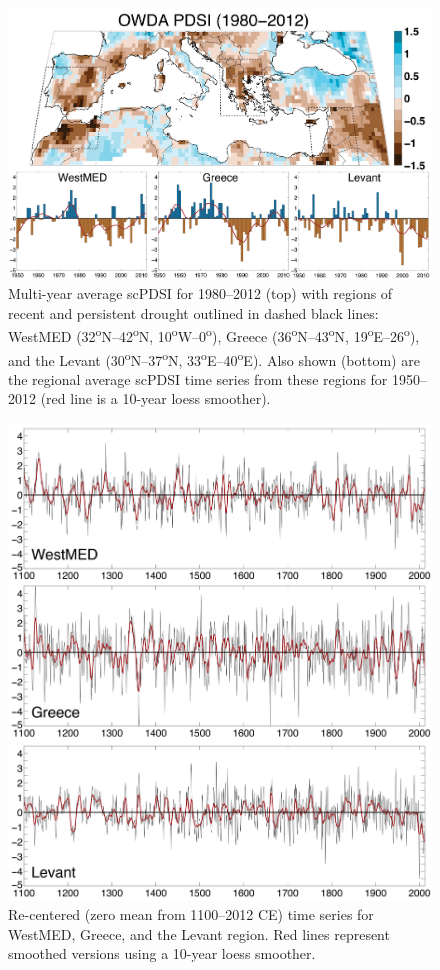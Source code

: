 \documentclass[draft,jgr]{AGUTeX}
\begin{document}
\begin{figure}
\center
\includegraphics[width=1.0\columnwidth]{fig_11_map_bar_pdsi.png}
\caption{Multi-year average scPDSI for 1980--2012 (top) with regions of recent and persistent drought outlined in dashed black lines: WestMED (32\textsuperscript{o}N--42\textsuperscript{o}N, 10\textsuperscript{o}W--0\textsuperscript{o}), Greece (36\textsuperscript{o}N--43\textsuperscript{o}N, 19\textsuperscript{o}E--26\textsuperscript{o}), and the Levant (30\textsuperscript{o}N--37\textsuperscript{o}N, 33\textsuperscript{o}E--40\textsuperscript{o}E). Also shown (bottom) are the regional average scPDSI time series from these regions for 1950--2012 (red line is a 10-year loess smoother).}\label{placeholder}
\end{figure}

\begin{figure}
\center
\includegraphics[width=0.9\columnwidth]{fig_12_regional_series_MED1.png}
\caption{Re-centered (zero mean from 1100--2012 CE) time series for WestMED, Greece, and the Levant region. Red lines represent smoothed versions using a 10-year loess smoother.}\label{placeholder}
\end{figure}
\end{document}

